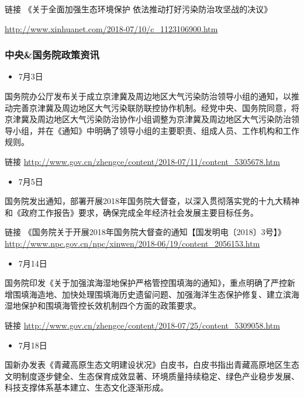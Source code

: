 \documentclass[]{book}
\providecommand{\tightlist}{%
  \setlength{\itemsep}{0pt}\setlength{\parskip}{0pt}}
\begin{document}
链接 《关于全面加强生态环境保护 依法推动打好污染防治攻坚战的决议》

\url{http://www.xinhuanet.com/2018-07/10/c_1123106900.htm}

\subsubsection*{中央\&国务院政策资讯}\label{-3}

\begin{itemize}
\tightlist
\item
  7月3日
\end{itemize}

国务院办公厅发布关于成立京津冀及周边地区大气污染防治领导小组的通知，以推动完善京津冀及周边地区大气污染联防联控协作机制。经党中央、国务院同意，将京津冀及周边地区大气污染防治协作小组调整为京津冀及周边地区大气污染防治领导小组，并在《通知》中明确了领导小组的主要职责、组成人员、工作机构和工作规则。

链接
\url{http://www.gov.cn/zhengce/content/2018-07/11/content_5305678.htm}

\begin{itemize}
\tightlist
\item
  7月5日
\end{itemize}

国务院发出通知，部署开展2018年国务院大督查，以深入贯彻落实党的十九大精神和《政府工作报告》要求，确保完成全年经济社会发展主要目标任务。

链接
《国务院关于开展2018年国务院大督查的通知【国发明电〔2018〕3号】》\url{http://www.npc.gov.cn/npc/xinwen/2018-06/19/content_2056153.htm}

\begin{itemize}
\tightlist
\item
  7月14日
\end{itemize}

国务院印发《关于加强滨海湿地保护严格管控围填海的通知》，重点明确了严控新增围填海造地、加快处理围填海历史遗留问题、加强海洋生态保护修复、建立滨海湿地保护和围填海管控长效机制四个方面的政策要求。

链接
\url{http://www.gov.cn/zhengce/content/2018-07/25/content_5309058.htm}

\begin{itemize}
\tightlist
\item
  7月18日
\end{itemize}

国新办发表《青藏高原生态文明建设状况》白皮书，白皮书指出青藏高原地区生态文明制度逐步健全、生态保育成效显著、环境质量持续稳定、绿色产业稳步发展、科技支撑体系基本建立、生态文化逐渐形成。
\end{document}
